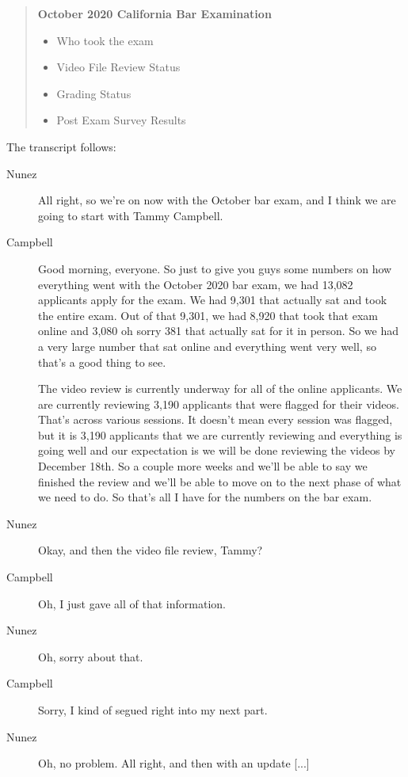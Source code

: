 \begin{quote}
\textbf{October 2020 California Bar Examination}
\begin{itemize}
\item Who took the exam
\item Video File Review Status
\item Grading Status
\item Post Exam Survey Results
\end{itemize}
\end{quote}

\noindent The transcript follows:

\begin{description}
\item[Nunez] All right, so we're on now with the October bar exam, and I think
    we are going to start with Tammy Campbell.
\item[Campbell] Good morning, everyone. So just to give you guys some numbers on
    how everything went with the October 2020 bar exam, we had 13,082 applicants
    apply for the exam. We had 9,301 that actually sat and took the entire exam.
    Out of that 9,301, we had 8,920 that took that exam online and 3,080 oh
    sorry 381 that actually sat for it in person. So we had a very large number
    that sat online and everything went very well, so that's a good thing to
    see.

    The video review is currently underway for all of the online applicants. We
    are currently reviewing 3,190 applicants that were flagged for their videos.
    That's across various sessions. It doesn't mean every session was flagged,
    but it is 3,190 applicants that we are currently reviewing and everything is
    going well and our expectation is we will be done reviewing the videos by
    December 18th. So a couple more weeks and we'll be able to say we finished
    the review and we'll be able to move on to the next phase of what we need to
    do. So that's all I have for the numbers on the bar exam.
\item[Nunez] Okay, and then the video file review, Tammy?
\item[Campbell] Oh, I just gave all of that information.
\item[Nunez] Oh, sorry about that.
\item[Campbell] Sorry, I kind of segued right into my next part.
\item[Nunez] Oh, no problem. All right, and then with an update [...]
\end{description}

